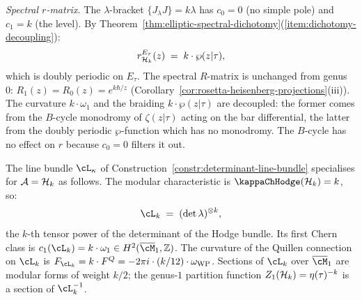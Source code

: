 \begin{computation}
\smallskip
\noindent
\emph{Spectral $r$-matrix.}
The $\lambda$-bracket $\{J_\lambda J\} = k\lambda$
has $c_0 = 0$ (no simple pole) and $c_1 = k$ (the
level). By
Theorem~\ref{thm:elliptic-spectral-dichotomy}(\ref{item:dichotomy-decoupling}):
\begin{equation}\label{eq:heisenberg-genus1-rmatrix}
r^{E_\tau}_{\mathcal{H}_k}(z)
\;=\;
k \cdot \wp(z|\tau),
\end{equation}
which is doubly periodic on $E_\tau$. The spectral
$R$-matrix is unchanged from genus~$0$:
$R_1(z) = R_0(z) = e^{k\hbar/z}$
(Corollary~\ref{cor:rosetta-heisenberg-projections}(iii)).
The curvature $k \cdot \omega_1$ and the braiding
$k \cdot \wp(z|\tau)$ are decoupled: the former comes
from the $B$-cycle monodromy of $\zeta(z|\tau)$
acting on the bar differential, the latter from the
doubly periodic $\wp$-function which has no monodromy.
The $B$-cycle has no effect on $r$ because $c_0 = 0$
filters it out.
\end{computation}

\begin{computation}
\label{comp:heisenberg-line-bundle}
The line bundle $\cL_\kappa$ of Construction~\ref{constr:determinant-line-bundle} specialises for $\mathcal{A} = \mathcal{H}_k$ as follows. The modular characteristic is $\kappaChHodge(\cH_k) = k$, so:
\[
\cL_k \;=\; (\det \lambda)^{\otimes k},
\]
the $k$-th tensor power of the determinant of the Hodge bundle. Its first Chern class is $c_1(\cL_k) = k \cdot \omega_1 \in H^2(\overline{\cM}_1, \Z)$. The curvature of the Quillen connection on $\cL_k$ is $F_{\cL_k} = k \cdot F^Q = -2\pi i \cdot (k/12) \cdot \omega_{\mathrm{WP}}$. Sections of $\cL_k$ over $\overline{\cM}_1$ are modular forms of weight $k/2$; the genus-$1$ partition function $Z_1(\mathcal{H}_k) = \eta(\tau)^{-k}$ is a section of $\cL_k^{-1}$.
\end{computation}

